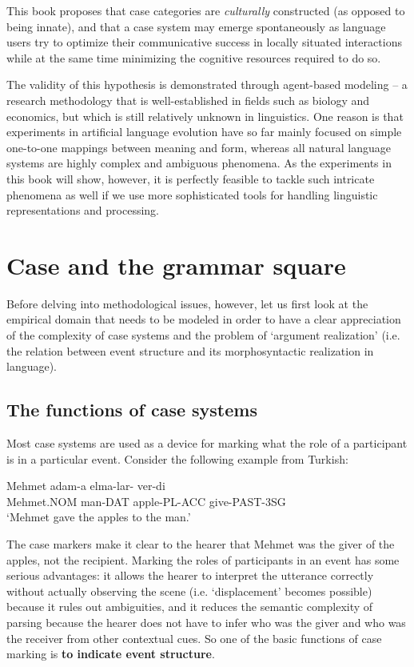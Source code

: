 This book proposes that case categories are {\em culturally} constructed (as opposed to being innate), and that a case system may emerge spontaneously as language users try to optimize their communicative success in locally situated interactions while at the same time minimizing the cognitive resources required to do so. 

The validity of this hypothesis is demonstrated through agent-based modeling -- a research methodology that is well-established in fields such as biology and economics, but which is still relatively unknown in linguistics. One reason is that experiments in artificial language evolution have so far mainly focused on simple one-to-one mappings between meaning and form, whereas all natural language systems are highly complex and ambiguous phenomena. As the experiments in this book will show, however, it is perfectly feasible to tackle such intricate phenomena as well if we use more sophisticated tools for handling linguistic representations and processing. 

\section{Case and the grammar square}
\label{s:grammar-square}

Before delving into methodological issues, however, let us first look at the empirical domain that needs to be modeled in order to have a clear appreciation of the complexity of case systems and the problem of `argument realization' (i.e. the relation between event structure and its morphosyntactic realization in language).

\subsection{The functions of case systems}
\label{s:case-functions}

Most case systems are used as a device for marking what the role of a participant is in a particular event. Consider the following example from Turkish:

\label{e:case1}
\ea
\gll Mehmet adam-a elma-lar-{\em \textiota} ver-di \\
	Mehmet.NOM man-DAT apple-PL-ACC give-PAST-3SG \\
\glt `Mehmet gave the apples to the man.' \citep[1, example 1]{blake94case}
\z

The case markers make it clear to the hearer that Mehmet was the giver of the apples, not the recipient. Marking the roles of participants in an event has some serious advantages: it allows the hearer to interpret the utterance correctly without actually observing the scene (i.e. `displacement' becomes possible) because it rules out ambiguities, and it reduces the semantic complexity of parsing because the hearer does not have to infer who was the giver and who was the receiver from other contextual cues. So one of the basic functions of case marking is {\bfseries to indicate event structure}.


